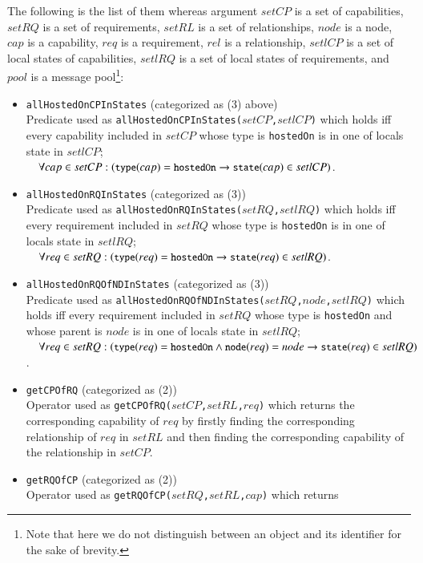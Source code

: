 \documentclass[12pt]{report}
\newcommand{\ra}{\rightarrow}
\newcommand{\mbstt}[1]{\mbox{\small{\tt {#1}}}}
\newcommand{\stt}[1]{{\small{\tt {#1}}}}
\begin{document}
The following is the list of them whereas argument $setCP$ is a set of
capabilities, $setRQ$ is a set of requirements, $setRL$ is a set of
relationships, $node$ is a node, $cap$ is a capability, $req$ is a
requirement, $rel$ is a relationship, $setlCP$ is a set of local
states of capabilities, $setlRQ$ is a set of local states of
requirements, and $pool$ is a message pool\footnote{Note that here we
  do not distinguish between an object and its identifier for the sake
  of brevity.}:
\begin{itemize}
\item \stt{allHostedOnCPInStates} (categorized as (3) above)\\ 
  Predicate used as \stt{allHostedOnCPInStates($setCP$,$setlCP$)}
  which holds iff every capability included in $setCP$ whose type is
  {\tt hostedOn} is in one of locals state in $setlCP$;\\$~~~~\forall
  cap\in
  setCP:(\mbstt{type}(cap)=\mbstt{hostedOn}\ra\mbstt{state}(cap)\in
  setlCP)$.
\item \stt{allHostedOnRQInStates} (categorized as (3))\\ 
  Predicate used as \stt{allHostedOnRQInStates($setRQ$,$setlRQ$)}
  which holds iff every requirement included in $setRQ$ whose type is
  {\tt hostedOn} is in one of locals state in $setlRQ$;\\$~~~~\forall
  req\in
  setRQ:(\mbstt{type}(req)=\mbstt{hostedOn}\ra\mbstt{state}(req)\in
  setlRQ)$.
\item \stt{allHostedOnRQOfNDInStates} (categorized as (3))\\ 
  Predicate used as
  \stt{allHostedOnRQOfNDInStates($setRQ$,$node$,$setlRQ$)} which holds iff
  every requirement included in $setRQ$ whose type is {\tt hostedOn} and whose
  parent is $node$ is in one of locals state in $setlRQ$;\\$~~~~\forall
  req\in
  setRQ:(\mbstt{type}(req)=\mbstt{hostedOn}\land\mbstt{node}(req)=node\ra\mbstt{state}(req)\in
  setlRQ)$.
\item \stt{getCPOfRQ} (categorized as (2))\\
 Operator used as \stt{getCPOfRQ($setCP$,$setRL$,$req$)} which returns
 the corresponding capability of $req$ by firstly finding the
 corresponding relationship of $req$ in $setRL$ and then finding the
 corresponding capability of the relationship in $setCP$.
\item \stt{getRQOfCP} (categorized as (2))\\
 Operator used as \stt{getRQOfCP($setRQ$,$setRL$,$cap$)} which returns

\end{itemize}
\end{document}

